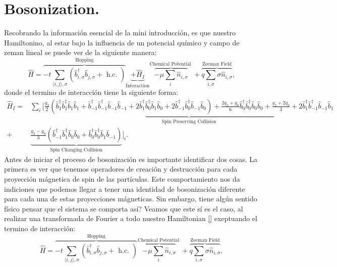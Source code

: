 \section{Bosonization.}
Recobrando la información esencial de la mini introducción, es que nuestro Hamiltonino, al estar bajo la influencia de un potencial químico y campo de zeman lineal se puede ver de la siguiente manera:
\begin{equation}
    \hat{H}=\overbrace{-t \sum_{\langle i, j\rangle, \sigma}\left(\hat{b}_{i, \sigma}^{\dagger} \hat{b}_{j, \sigma}+\text { h.c. }\right)}^{\text {Hopping}} \underbrace{+\hat{H}_I}_{\text {Interaction}} \overbrace{-\mu \sum_i \hat{n}_{i, \sigma}}^{\text {Chemical Potential }}+\overbrace{q \sum_{i, \sigma} \sigma \hat{n}_{i, \sigma}}^{\text {Zeeman Field}} \text{,}
\end{equation}
donde el termino de interacción tiene la siguiente forma:
\footnotesize 
\begin{align}
    \hat{H}_{I} = &\sum_i \Bigg[ \underbrace{\frac{g_2}{2} \left( \hat{b}_{1}^{\dagger}\hat{b}_{1}^{\dagger} \hat{b}_{1}^{} \hat{b}_{1}^{} 
    + \hat{b}_{-1}^{\dagger}\hat{b}_{-1}^{\dagger} \hat{b}_{-1}^{} \hat{b}_{-1}^{} 
    + 2\hat{b}_{1}^{\dagger}\hat{b}_{0}^{\dagger} \hat{b}_{1}^{} \hat{b}_{0}^{}  
    + 2\hat{b}_{-1}^{\dagger}\hat{b}_{0}^{\dagger} \hat{b}_{-1}^{} \hat{b}_{0}^{} \right) 
    + \frac{2g_{2} + g_{0}}{6} \hat{b}_{0}^{\dagger}\hat{b}_{0}^{\dagger} \hat{b}_{0}^{} \hat{b}_{0}^{}+\frac{g_{2} + 2g_{0}}{3} + 2\hat{b}_{1}^{\dagger}\hat{b}_{-1}^{\dagger} \hat{b}_{-1}^{} \hat{b}_{1}^{} }_{\text {Spin Preserving Collision}}  \nonumber \\
 +&\underbrace{\frac{g_{2}-g_{0}}{3} \left( \hat{b}_{-1}^{\dagger}\hat{b}_{1}^{\dagger} \hat{b}_{0}^{} \hat{b}_{0}^{} + \hat{b}_{0}^{\dagger}\hat{b}_{0}^{\dagger} \hat{b}_{1}^{} \hat{b}_{-1}^{}\right)}_{\text {Spin Changing Collision}} 
    \Bigg]_{i}.
\end{align}
\normalsize
Antes de iniciar el proceso de bosonización es importante identificar dos cosas. La primera es ver que tenemos operadores de creación y destrucción para cada proyección mágnetica de spin de las partículas. Este comportamiento nos da indiciones que podemos llegar a tener una identidad de bosonización diferente para cada una de estas proyecciones mágneticas. Sin embargo, tiene algún sentido físico pensar que el sistema se comporta así? Veamos que este sí es el caso, al realizar una transformada de Fourier a todo nuestro Hamiltonian \eqref{} exeptuando el termino de interacción:
\begin{equation}
    \hat{H}=\overbrace{-t \sum_{\langle i, j\rangle, \sigma}\left(\hat{b}_{i, \sigma}^{\dagger} \hat{b}_{j, \sigma}+\text { h.c. }\right)}^{\text {Hopping}}  \overbrace{-\mu \sum_i \hat{n}_{i, \sigma}}^{\text {Chemical Potential }}+\overbrace{q \sum_{i, \sigma} \sigma \hat{n}_{i, \sigma}}^{\text {Zeeman Field}} \text{,}
\end{equation}
